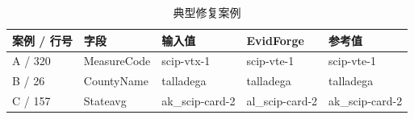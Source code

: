 \begin{table}[tb]
\centering
\caption{典型修复案例}
\label{tab:natural-cases}
\fontsize{7.5}{9}\selectfont
\setlength{\tabcolsep}{1pt}
\renewcommand{\arraystretch}{1.10}
\begin{tabular*}{\columnwidth}{@{\extracolsep{\fill}}lllll@{}}
\toprule
案例 / 行号 & 字段 & 输入值 & EvidForge & 参考值 \\
\midrule
A / 320 & MeasureCode & scip-vtx-1 & scip-vte-1 & scip-vte-1 \\
B / 26 & CountyName & talladega & talladega & talladega \\
C / 157 & Stateavg & ak\_scip-card-2 & al\_scip-card-2 & ak\_scip-card-2 \\
\bottomrule
\end{tabular*}
\end{table}
